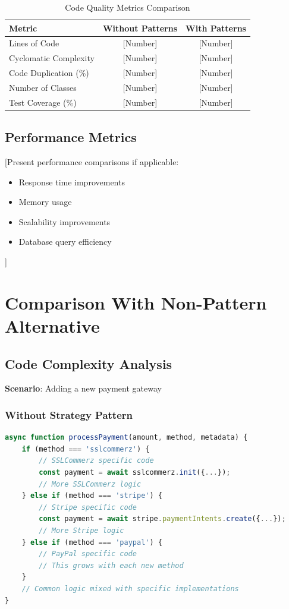 \documentclass[a4paper,12pt]{report}
\begin{document}
\begin{table}[h]
\centering
\begin{tabular}{|l|c|c|}
\hline
\textbf{Metric} & \textbf{Without Patterns} & \textbf{With Patterns} \\
\hline
Lines of Code & [Number] & [Number] \\
\hline
Cyclomatic Complexity & [Number] & [Number] \\
\hline
Code Duplication (\%) & [Number] & [Number] \\
\hline
Number of Classes & [Number] & [Number] \\
\hline
Test Coverage (\%) & [Number] & [Number] \\
\hline
\end{tabular}
\caption{Code Quality Metrics Comparison}
\label{tab:metrics}
\end{table}

\subsection{Performance Metrics}

[Present performance comparisons if applicable:
\begin{itemize}
    \item Response time improvements
    \item Memory usage
    \item Scalability improvements
    \item Database query efficiency
\end{itemize}]

\section{Comparison With Non-Pattern Alternative}

\subsection{Code Complexity Analysis}

\textbf{Scenario}: Adding a new payment gateway

\subsubsection{Without Strategy Pattern}
\begin{lstlisting}[language=JavaScript, caption=Without Pattern - Complex Conditionals]
async function processPayment(amount, method, metadata) {
    if (method === 'sslcommerz') {
        // SSLCommerz specific code
        const payment = await sslcommerz.init({...});
        // More SSLCommerz logic
    } else if (method === 'stripe') {
        // Stripe specific code
        const payment = await stripe.paymentIntents.create({...});
        // More Stripe logic
    } else if (method === 'paypal') {
        // PayPal specific code
        // This grows with each new method
    }
    // Common logic mixed with specific implementations
}
\end{lstlisting}
\end{document}
